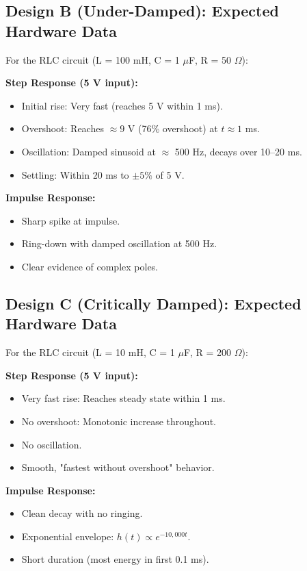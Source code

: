 \documentclass[11pt,letterpaper]{article}
\begin{document}
\subsection{Design B (Under-Damped): Expected Hardware Data}

For the RLC circuit (L = 100 mH, C = 1 $\mu$F, R = 50 $\Omega$):

\noindent
\textbf{Step Response (5 V input):}

\begin{itemize}
    \item Initial rise: Very fast (reaches 5 V within 1 ms).
    \item Overshoot: Reaches $\approx 9$ V (76\% overshoot) at $t \approx 1$ ms.
    \item Oscillation: Damped sinusoid at $\approx$ 500 Hz, decays over 10--20 ms.
    \item Settling: Within 20 ms to $\pm 5\%$ of 5 V.
\end{itemize}

\noindent
\textbf{Impulse Response:}

\begin{itemize}
    \item Sharp spike at impulse.
    \item Ring-down with damped oscillation at 500 Hz.
    \item Clear evidence of complex poles.
\end{itemize}

\subsection{Design C (Critically Damped): Expected Hardware Data}

For the RLC circuit (L = 10 mH, C = 1 $\mu$F, R = 200 $\Omega$):

\noindent
\textbf{Step Response (5 V input):}

\begin{itemize}
    \item Very fast rise: Reaches steady state within 1 ms.
    \item No overshoot: Monotonic increase throughout.
    \item No oscillation.
    \item Smooth, "fastest without overshoot" behavior.
\end{itemize}

\noindent
\textbf{Impulse Response:}

\begin{itemize}
    \item Clean decay with no ringing.
    \item Exponential envelope: $h(t) \propto e^{-10,000 t}$.
    \item Short duration (most energy in first 0.1 ms).
\end{itemize}
\end{document}
